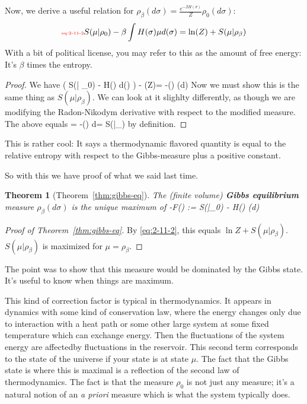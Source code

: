 \documentclass[12pt]{book}
\newtheorem*{thm*}{Theorem}
\theoremstyle{norm}
\begin{document}
Now, we derive a useful relation for  $\rho_{\beta}(d\sigma)  = \frac{e^{-\beta H(\sigma)}}{Z} \rho_0 (d\sigma)$:
\begin{equation}\label{eq:2-11-2}\text{{\color{red}\tiny eq:2-11-2}}
S(\mu | \rho_0) - \beta \int H(\sigma) \mu d(\sigma) = \ln(Z) + S(\mu | \rho_{\beta})
\end{equation}
With a bit of political license, you may refer to this as the amount of free energy: It's $\beta$ times the entropy. %
\begin{proof}
We have
\be
\left( {S(\mu | \rho_0) - \beta \int H(\sigma) \mu d(\sigma)} \right) - \ln (Z)=
-\int \ln\left(\frac{\delta\mu}{\delta\rho}\cdot {}\right) \mu (d\sigma )
\ee
Now we must show this is the same thing as $S(\mu | \rho_{\beta})$. We can look at it slighlty differently, as though we are modifying the Radon-Nikodym derivative with respect to the modified measure. The above equals
\be
= -\int \ln\left(\frac{\delta\mu}{\delta\rho_{\beta}}\right) \mu d\sigma = S(\mu|\rho_{\beta})
\ee
by definition. 
\end{proof}
This is rather cool: It says a thermodynamic flavored quantity is equal to the relative entropy with respect to the Gibbs-measure plus a positive constant. %

So with this we have proof of what we said last time.

\begin{thm*}[Theorem~\ref{thm:gibbs-eq}]
The (finite volume) \textbf{Gibbs equilibrium} measure $\rho_{\beta}(d\sigma)$ is the unique maximum of 
\be
-\beta F(\mu) := S(\mu|\rho_0) - \beta \int H(\sigma) \mu (d\sigma)
\ee
\end{thm*}
\begin{proof}[Proof of Theorem~\ref{thm:gibbs-eq}]
By \eqref{eq:2-11-2}, this equals $\ln Z + S(\mu|\rho_\beta)$. $S(\mu|\rho_\beta)$ is maximized for $\mu=\rho_\beta$.
\end{proof}

The point was to show that this measure would be dominated by the Gibbs state. It's useful to know when things are maximum. 

This kind of correction factor is typical in thermodynamics. It appears in dynamics with some kind of conservation law, where the energy changes only due to interaction with a heat path or some other large system at some fixed temperature which can exchange energy. 
Then the fluctuations of the system energy are affectedby fluctuations in the reservoir. This second term corresponds to the state of the universe if your state is at state $\mu$. The fact that the Gibbs state is where this is maximal is a reflection of the second law of thermodynamics. The fact is that the measure $\rho_0$ is not just any measure; it's a natural notion of an \textit{a priori} measure which is what the system typically does. 
\end{document}
